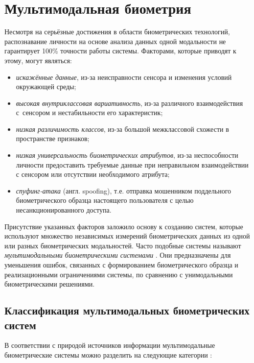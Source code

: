 \documentclass[12pt]{book}
\begin{document}
\section{Мультимодальная биометрия}

\large{Несмотря на серьёзные достижения в области биометрических технологий, распознавание личности на основе анализа данных одной модальности не гарантирует 100\% точности работы системы. Факторами, которые приводят к этому, могут являться:

\begin{itemize}[topsep=1pt] \itemsep0.1em
\item \textit{искажённые данные}, из-за неисправности сенсора и изменения условий окружающей среды;
\item \textit{высокая внутриклассовая вариативность}, из-за различного взаимодействия с~сенсором и нестабильности его характеристик;
\item \textit{низкая различимость классов}, из-за большой межклассовой схожести в пространстве признаков;
\item \textit{низкая универсальность биометрических атрибутов}, из-за неспособности личности предоставить требуемые данные при неправильном взаимодействии с сенсором или отсутствии необходимого атрибута;
\item \textit{спуфинг-атака} (англ. spoofing), т.е. отправка мошенником поддельного биометрического образца настоящего пользователя с целью несанкционированного доступа.
\end{itemize}

\large{Присутствие указанных факторов заложило основу к созданию систем, которые используют множество независимых измерений биометрических данных из одной или разных биометрических модальностей. Часто подобные системы называют \textit{мультимодальными биометрическими системами} \cite{unar_2014, dahea_2018}. Они предназначены для уменьшения ошибок, связанных с формированием биометрического образца и реализационными ограничениями системы, по сравнению с унимодальными биометрическими решениями.

}

\subsection{Классификация мультимодальных биометрических систем}

\large{В соответствии с природой источников информации мультимодальные биометрические системы можно разделить на следующие категории \cite{unar_2014}:

}}
\end{document}
